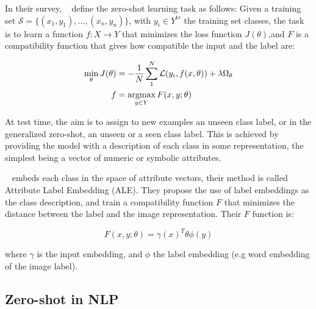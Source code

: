 In their survey, ~\citet{xian2017zero} define the zero-shot learning task as follows: Given a training set $\mathcal{S} = \{(x_1, y_1), \dots, (x_n, y_n)\}$, with $y_i \in Y^{tr}$ the training set classes, the task is to learn a function $f: X \rightarrow Y$ that minimizes the loss function $J(\theta)$,and $F$ is a compatibility function that gives how compatible the input and the label are: 

\begin{equation}
\begin{split}
    \min_{\theta} J(\theta) & = - \frac{1}{N} \sum_{1}^{N} \mathcal{L}(y_i, f(x, \theta)) + \lambda \Omega_\theta \\
    f & = \operatorname*{argmax}_{y \in Y} F(x, y; \theta)
\end{split}
\end{equation}

At test time, the aim is to assign to new examples an unseen class label, or in the generalized zero-shot, an unseen or a seen class label. This is achieved by providing the model with a description of each class in some representation, the simplest being a vector of numeric or symbolic attributes.

~\cite{akata2015ale} embeds each class in the space of attribute vectors, their method is called Attribute Label Embedding (ALE). They propose the use of label embeddings as the class description, and train a compatibility function $F$ that minimizes the distance between the label and the image representation. Their $F$ function is:

\begin{equation}
F(x, y ; \theta)=\gamma(x)^{T} \theta \phi(y)
\end{equation}

where $\gamma$ is the input embedding, and $\phi$ the label embedding (e.g word embedding of the image label). 


\newpage
\subsection{Zero-shot in NLP}
